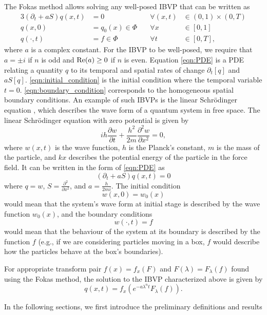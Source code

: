 \documentclass[11pt, oneside, a4paper]{article}
\begin{document}
The Fokas method allows solving any well-posed IBVP that can be written as
\begin{alignat}{3}
    (\partial_t + aS)q(x,t) &= 0\quad &\forall (x,t)&\in (0,1)\times (0,T) \label{eqn:PDE}\\
    q(x,0) &= q_0(x)\in \Phi\quad &\forall x&\in [0,1]\label{eqn:initial_condition}\\
    q(\cdot, t) &= f \in \Phi \quad &\forall t&\in [0,T],\label{eqn:boundary_condition}
\end{alignat}
where $a$ is a complex constant. For the IBVP to be well-posed, we require that $a=\pm i$ if $n$ is odd and $\mathrm{Re}(a)\geq 0$ if $n$ is even. Equation \ref{eqn:PDE} is a PDE relating a quantity $q$ to its temporal and spatial rates of change $\partial_t[q]$ and $aS[q]$. \ref{eqn:initial_condition} is the initial condition where the temporal variable $t=0$. \ref{eqn:boundary_condition} corresponds to the homogeneous spatial boundary conditions. 
An example of such IBVPs is the linear Schr\"{o}dinger equation \cite{Taylor2018}, which describes the wave form of a quantum system in free space. The linear Schr\"{o}dinger equation with zero potential is given by
\[ih\frac{\partial w}{\partial t} + \frac{h^2}{2m}\frac{\partial^2 w}{\partial x^2} = 0,\]
where $w(x,t)$ is the wave function, $h$ is the Planck's constant, $m$ is the mass of the particle, and $kx$ describes the potential energy of the particle in the force field. It can be written in the form of \ref{eqn:PDE} as
\[(\partial_t + aS)q(x,t) = 0\]
where $q=w$, $\displaystyle S = \frac{\partial^2}{\partial x^2}$, and $\displaystyle a = \frac{h}{2mi}$. The initial condition 
\[w(x,0) = w_0(x)\]
would mean that the system's wave form at initial stage is described by the wave function $w_0(x)$, and the boundary conditions 
\[w(\cdot, t) = f\]
would mean that the behaviour of the system at its boundary is described by the function $f$ (e.g., if we are considering particles moving in a box, $f$ would describe how the particles behave at the box's boundaries).

For appropriate transform pair $f(x)=f_x(F)$ and $F(\lambda)=F_\lambda(f)$ found using the Fokas method, the solution to the IBVP characterized above is given by \cite[p.15]{Smith2016}
\begin{equation}\label{eqn:solution}
    q(x,t) = f_x(e^{-a\lambda^n t}F_\lambda(f)).
\end{equation}

In the following sections, we first introduce the preliminary definitions and results 
\end{document}

